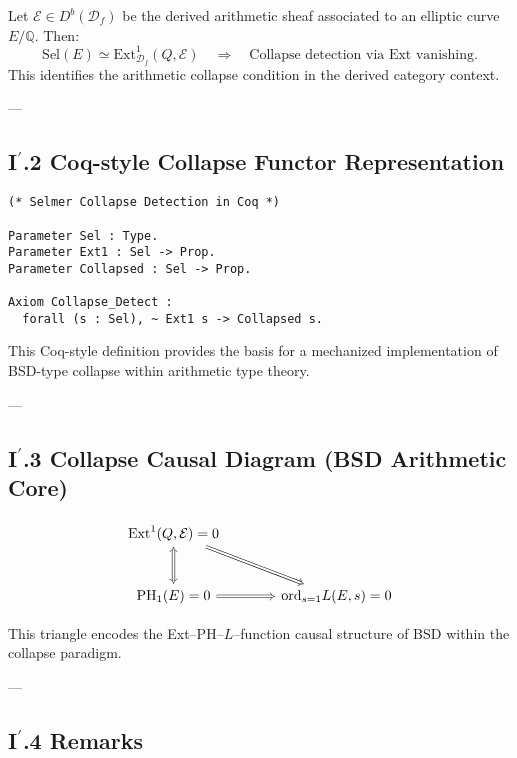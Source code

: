 \documentclass[11pt]{article}
\begin{document}
\begin{axiom}
Let \( \mathcal{E} \in D^b(\mathcal{D}_f) \) be the derived arithmetic sheaf associated to an elliptic curve \( E/\mathbb{Q} \). Then:
\[
\mathrm{Sel}(E) \simeq \mathrm{Ext}^1_{\mathcal{D}_f}(Q, \mathcal{E}) \quad \Rightarrow \quad \text{Collapse detection via Ext vanishing.}
\]
This identifies the arithmetic collapse condition in the derived category context.
\end{axiom}

---

\subsection*{I$^\prime$.2 Coq-style Collapse Functor Representation}

\begin{lstlisting}[language=Coq, caption=Collapse Detection Axiom in Arithmetic Type Theory]
(* Selmer Collapse Detection in Coq *)

Parameter Sel : Type.
Parameter Ext1 : Sel -> Prop.
Parameter Collapsed : Sel -> Prop.

Axiom Collapse_Detect :
  forall (s : Sel), ~ Ext1 s -> Collapsed s.
\end{lstlisting}

This Coq-style definition provides the basis for a mechanized implementation  
of BSD-type collapse within arithmetic type theory.

---

\subsection*{I$^\prime$.3 Collapse Causal Diagram (BSD Arithmetic Core)}

\[
\begin{tikzcd}[row sep=large, column sep=large]
\mathrm{Ext}^1(Q, \mathcal{E}) = 0 \arrow[dr, Rightarrow] & \\
\mathrm{PH}_1(E) = 0 \arrow[u, Leftrightarrow] \arrow[r, Rightarrow] & \mathrm{ord}_{s=1} L(E,s) = 0
\end{tikzcd}
\]

This triangle encodes the Ext–PH–$L$–function causal structure of BSD within the collapse paradigm.

---

\subsection*{I$^\prime$.4 Remarks}
\end{document}
